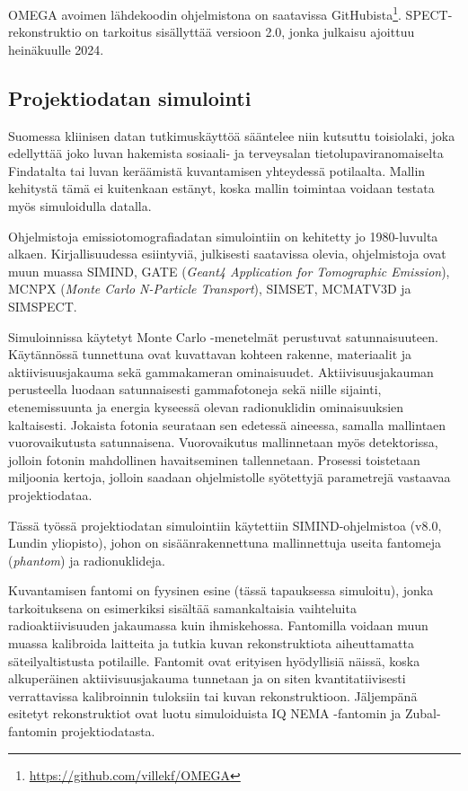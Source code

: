 OMEGA avoimen lähdekoodin ohjelmistona on saatavissa GitHubista\footnote{\url{https://github.com/villekf/OMEGA}}. SPECT-rekonstruktio on tarkoitus sisällyttää versioon 2.0, jonka julkaisu ajoittuu heinäkuulle 2024.

\subsection{Projektiodatan simulointi}
Suomessa kliinisen datan tutkimuskäyttöä sääntelee niin kutsuttu toisiolaki, joka edellyttää joko luvan hakemista sosiaali- ja terveysalan tietolupaviranomaiselta Findatalta tai luvan keräämistä kuvantamisen yhteydessä potilaalta. Mallin kehitystä tämä ei kuitenkaan estänyt, koska mallin toimintaa voidaan testata myös simuloidulla datalla.

Ohjelmistoja emissiotomografiadatan simulointiin on kehitetty jo 1980-luvulta alkaen\cite{ljungberg_monte_1989}. Kirjallisuudessa esiintyviä, julkisesti saatavissa olevia, ohjelmistoja ovat muun muassa SIMIND\cite{ljungberg_monte_1989, taheri_monte_2017, giannone_monte_1999}, GATE (\textit{Geant4 Application for Tomographic Emission})\cite{jan_gate_2004, taheri_monte_2017}, MCNPX (\textit{Monte Carlo N-Particle Transport})\cite{taheri_monte_2017}, SIMSET\cite{giannone_monte_1999}, MCMATV3D\cite{giannone_monte_1999} ja SIMSPECT\cite{giannone_monte_1999}.

Simuloinnissa käytetyt Monte Carlo -menetelmät perustuvat satunnaisuuteen. Käytännössä tunnettuna ovat kuvattavan kohteen rakenne, materiaalit ja aktiivisuusjakauma sekä gammakameran ominaisuudet. Aktiivisuusjakauman perusteella luodaan satunnaisesti gammafotoneja sekä niille sijainti, etenemissuunta ja energia kyseessä olevan radionuklidin ominaisuuksien kaltaisesti. Jokaista fotonia seurataan sen edetessä aineessa, samalla mallintaen vuorovaikutusta satunnaisena. Vuorovaikutus mallinnetaan myös detektorissa, jolloin fotonin mahdollinen havaitseminen tallennetaan. Prosessi toistetaan miljoonia kertoja, jolloin saadaan ohjelmistolle syötettyjä parametrejä vastaavaa projektiodataa.\cite{ljungberg_monte_1989}

Tässä työssä projektiodatan simulointiin käytettiin SIMIND-ohjelmistoa (v8.0, Lundin yliopisto)\cite{ljungberg_monte_1989}, johon on sisäänrakennettuna mallinnettuja useita fantomeja (\textit{phantom}) ja radionuklideja.

Kuvantamisen fantomi on fyysinen esine (tässä tapauksessa simuloitu), jonka tarkoituksena on esimerkiksi sisältää samankaltaisia vaihteluita radioaktiivisuuden jakaumassa kuin ihmiskehossa. Fantomilla voidaan muun muassa kalibroida laitteita ja tutkia kuvan rekonstruktiota aiheuttamatta säteilyaltistusta potilaille. Fantomit ovat erityisen hyödyllisiä näissä, koska alkuperäinen aktiivisuusjakauma tunnetaan ja on siten kvantitatiivisesti verrattavissa kalibroinnin tuloksiin tai kuvan rekonstruktioon. Jäljempänä esitetyt rekonstruktiot ovat luotu simuloiduista IQ NEMA -fantomin\cite{nema2018} ja Zubal-fantomin\cite{zubal_computerized_1994} projektiodatasta.

